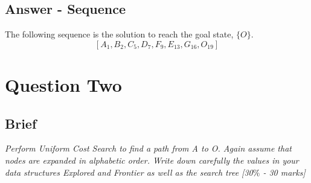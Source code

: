 \documentclass{article}
\begin{document}
\subsection{Answer - Sequence}
The following sequence is the solution to reach the goal state, $\{O\}$.
$$[A_{1}, B_{2}, C_{5}, D_{7}, F_{9}, E_{13}, G_{16}, O_{19}]$$

\newpage
\section{Question Two}
\subsection{Brief}
\flushleft\textit{Perform Uniform Cost Search to find a path from A to O. Again assume that nodes are expanded in alphabetic order. Write down carefully the values in your data structures Explored and Frontier as well as the search tree [30$\%$ - 30 marks]}
\end{document}
